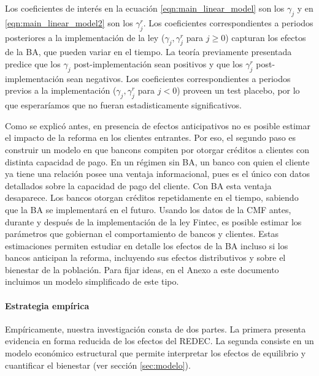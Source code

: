 \documentclass[11pt]{article}
\theoremstyle{plain}
\theoremstyle{plain}
\begin{document}
Los coeficientes de interés en la ecuación \ref{eqn:main_linear_model} son los $\gamma_j$ y en \ref{eqn:main_linear_model2} son los $\gamma_j^r$. Los coeficientes correspondientes a periodos posteriores a la implementación de la ley ($\gamma_j,  \gamma_j^r$ para $j \geq 0$) capturan los efectos de la BA, que pueden variar en el tiempo. La teoría previamente presentada predice que los $\gamma_j$ post-implementación sean positivos y que los $\gamma_j^r$ post-implementación sean negativos. Los coeficientes correspondientes a periodos previos a la implementación ($\gamma_j,  \gamma_j^r$ para $j < 0$) proveen un test placebo, por lo que esperaríamos que no fueran estadisticamente significativos.






Como se explicó antes, en presencia de efectos anticipativos no es posible estimar el impacto de la reforma en los clientes entrantes.
Por eso, el segundo paso es construir un modelo en que bancons compiten por otorgar créditos a clientes con distinta capacidad de pago. En un régimen sin BA, un banco con quien el cliente ya tiene una relación posee una ventaja informacional, pues es el único con datos detallados sobre la capacidad de pago del cliente. Con BA esta ventaja desaparece. Los bancos otorgan créditos repetidamente en el tiempo, sabiendo que la BA se implementará en el futuro. Usando los datos de la CMF antes, durante y después de la implementación de la ley Fintec, es posible estimar los parámetros que gobiernan el comportamiento de bancos y clientes. Estas estimaciones permiten estudiar en detalle los efectos de la BA incluso si los bancos anticipan la reforma, incluyendo sus efectos distributivos y sobre el bienestar de la población. Para fijar ideas, en el Anexo a este documento incluimos un modelo simplificado de este tipo.

\paragraph{Estrategia empírica}

Empíricamente, nuestra investigación consta de dos partes. La primera presenta evidencia en forma reducida de los efectos del REDEC. La segunda consiste en un modelo económico estructural que permite interpretar los efectos de equilibrio y cuantificar el bienestar (ver sección \ref{sec:modelo}).
\end{document}
